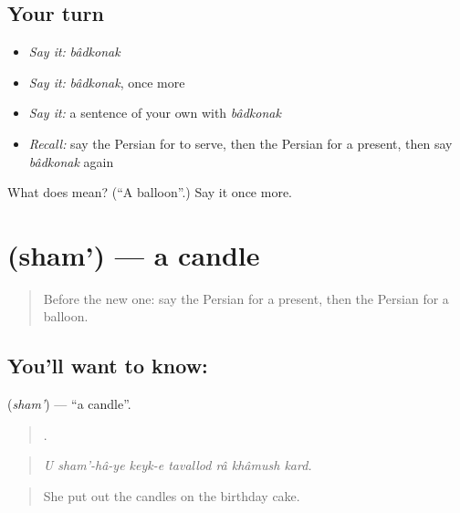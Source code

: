 \subsection*{Your turn}
\begin{itemize}
\raggedright
  \item \emph{Say it:} \emph{bâdkonak}
  \item \emph{Say it:} \emph{bâdkonak}, once more
  \item \emph{Say it:} a sentence of your own with \emph{bâdkonak}
  \item \emph{Recall:} say the Persian for to serve, then the Persian for a present, then say \emph{bâdkonak} again
\end{itemize}

\begin{tcolorbox}[breakable,colback=teal!4,colframe=teal!35!black,title={Before you move on}]
What does  mean? (\textquotedblleft{}A balloon\textquotedblright{}.) Say it once more.
\end{tcolorbox}
\section[\texorpdfstring{\fa{شمع} (sham')}{شمع (sham')}]{ (sham') — a candle}

\label{lesson:FA-C341-sham}



\begin{quote}
Before the new one: say the Persian for a present, then the Persian for a balloon.
\end{quote}

\subsection*{You'll want to know: }
\textbf{} (\emph{sham'}) — \textquotedblleft{}a candle\textquotedblright{}.

\begin{quote}
       .
\end{quote}

\begin{quote}
\emph{U sham'-hâ-ye keyk-e tavallod râ khâmush kard.}
\end{quote}

\begin{quote}
She put out the candles on the birthday cake.
\end{quote}

